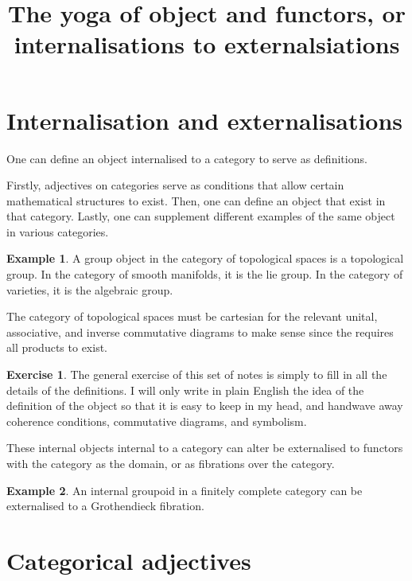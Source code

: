 \documentclass[10pt]{article}
\theoremstyle{plain}%
\theoremstyle{definition}
\newtheorem{example}{Example}[section]
\newtheorem{exercise}{Exercise}[section]
\theoremstyle{remark}
\begin{document}
\title{The yoga of object and functors, or internalisations to externalsiations}

\maketitle

\section{Internalisation and externalisations}

One can define an object internalised to a category to
serve as definitions.

Firstly, adjectives on categories serve as conditions that allow certain mathematical structures to exist. Then, one can define an object that exist in that category. Lastly, one can supplement different examples of the same object in various categories.

\begin{example}
    A group object in the category of topological spaces is a topological group. In the category of smooth manifolds, it is the lie group. In the category of varieties, it is the algebraic group.

    The category of topological spaces must be cartesian for the relevant unital, associative, and inverse commutative diagrams to make sense since the requires all products to exist.
\end{example}

\begin{exercise}
    The general exercise of this set of notes is simply to fill in all the details of the definitions. I will only write in plain English the idea of the definition of the object so that it is easy to keep in my head, and handwave away coherence conditions, commutative diagrams, and symbolism.
\end{exercise}

These internal objects internal to a category can alter be externalised to functors with the category as the domain, or as fibrations over the category.

\begin{example}
    An internal groupoid in a finitely complete category can be externalised to a Grothendieck fibration.
\end{example}

\section{Categorical adjectives}
\end{document}

